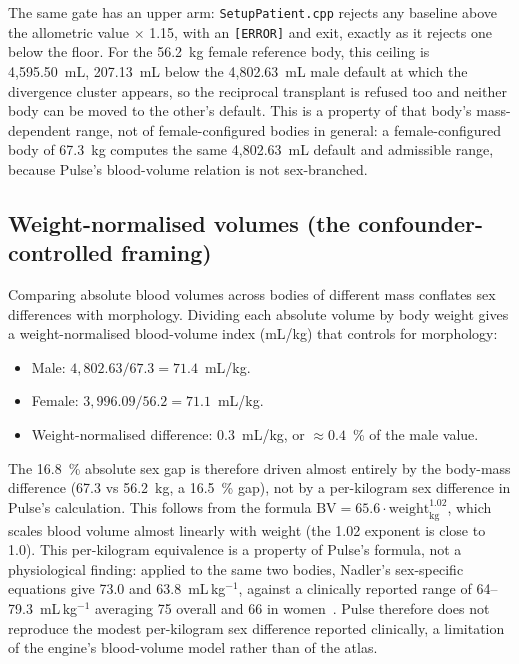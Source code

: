 \documentclass[pdflatex,sn-nature]{sn-jnl}%
\begin{document}
The same gate has an upper arm: \texttt{SetupPatient.cpp} rejects any baseline above the allometric value $\times$ 1.15, with an \texttt{[ERROR]} and exit, exactly as it rejects one below the floor. For the 56.2~kg female reference body, this ceiling is 4{,}595.50~mL, 207.13~mL below the 4{,}802.63~mL male default at which the divergence cluster appears, so the reciprocal transplant is refused too and neither body can be moved to the other's default. This is a property of that body's mass-dependent range, not of female-configured bodies in general: a female-configured body of 67.3~kg computes the same 4{,}802.63~mL default and admissible range, because Pulse's blood-volume relation is not sex-branched.

\subsection{Weight-normalised volumes (the confounder-controlled framing)}\label{sec:s10-norm}

Comparing absolute blood volumes across bodies of different mass conflates sex differences with morphology. Dividing each absolute volume by body weight gives a weight-normalised blood-volume index (mL/kg) that controls for morphology:

\begin{itemize}
\item Male: $4{,}802.63 / 67.3 = 71.4$~mL/kg.
\item Female: $3{,}996.09 / 56.2 = 71.1$~mL/kg.
\item Weight-normalised difference: $0.3$~mL/kg, or $\approx 0.4$~\% of the male value.
\end{itemize}

The 16.8~\% absolute sex gap is therefore driven almost entirely by the body-mass difference (67.3 vs 56.2~kg, a 16.5~\% gap), not by a per-kilogram sex difference in Pulse's calculation. This follows from the formula $\text{BV} = 65.6 \cdot \text{weight}_{\text{kg}}^{1.02}$, which scales blood volume almost linearly with weight (the 1.02 exponent is close to 1.0). This per-kilogram equivalence is a property of Pulse's formula, not a physiological finding: applied to the same two bodies, Nadler's sex-specific equations give 73.0 and 63.8~mL\,kg$^{-1}$, against a clinically reported range of 64--79.3~mL\,kg$^{-1}$ averaging 75 overall and 66 in women~\cite{nadler1962}. Pulse therefore does not reproduce the modest per-kilogram sex difference reported clinically, a limitation of the engine's blood-volume model rather than of the atlas.
\end{document}
